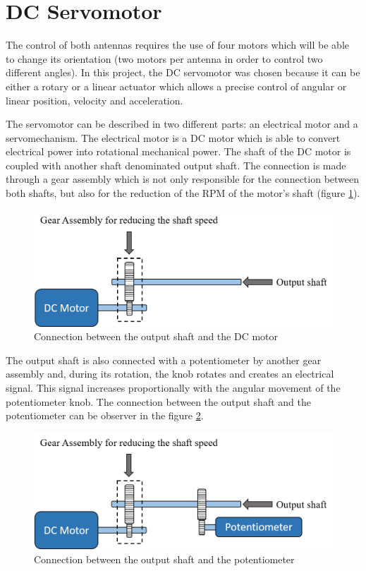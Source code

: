 \section{DC Servomotor}\label{sec:servo_motor}

The control of both antennas requires the use of four motors which will be able to change its orientation (two motors per antenna in order to control two different angles). In this project, the DC servomotor was chosen because it can be either a rotary or a linear actuator which allows a precise control of angular or linear position, velocity and acceleration.

The servomotor can be described in two different parts: an electrical motor and a servomechanism. The electrical motor is a DC motor which is able to convert electrical power into rotational mechanical power. The shaft of the DC motor is coupled with another shaft denominated output shaft. The connection is made through a gear assembly which is not only responsible for the connection between both shafts, but also for the reduction of the RPM of the motor’s shaft (figure \ref{servomotor_expl1}).

\begin{figure}[H]
\centering
\includegraphics[scale=0.7]{figures/servomotor_expl1.png}
\caption{Connection between the output shaft and the DC motor}
\label{servomotor_expl1}
\end{figure}

The output shaft is also connected with a potentiometer by another gear assembly and, during its rotation, the knob rotates and creates an electrical signal. This signal increases proportionally with the angular movement of the potentiometer knob. The connection between the output shaft and the potentiometer can be
observer in the figure \ref{servomotor_expl2}.

\begin{figure}[H]
\centering
\includegraphics[scale=0.7]{figures/servomotor_expl2.png}
\caption{Connection between the output shaft and the potentiometer}
\label{servomotor_expl2}
\end{figure}

